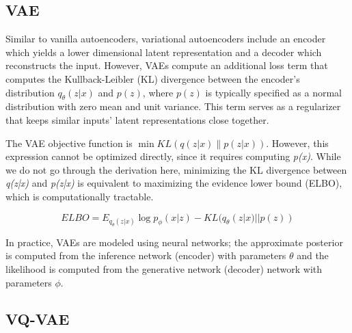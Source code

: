 \documentclass{article}
\begin{document}
\subsection{VAE}

Similar to vanilla autoencoders, variational autoencoders include an encoder which yields a lower dimensional latent representation and a decoder which reconstructs the input. However, VAEs compute an additional loss term that computes the Kullback-Leibler (KL) divergence between the encoder’s distribution \(q_{\theta}(z|x)\) and \(p(z)\), where \(p(z)\) is typically specified as a normal distribution with zero mean and unit variance. This term serves as a regularizer that keeps similar inputs’ latent representations close together.


The VAE objective function is $\min{KL(q(z|x) \| p(z|x))}$. However, this expression cannot be optimized directly, since it requires computing \textit{p(x)}. While we do not go through the derivation here, minimizing the KL divergence between \textit{q(z|x)} and \textit{p(z|x)} is equivalent to maximizing the evidence lower bound (ELBO), which is computationally tractable. 

\begin{equation}
ELBO = E_{q_{\theta}(z|x)} \log{p_{\phi}(x|z)} - KL(q_{\theta}(z|x)||p(z))
\end{equation}

In practice, VAEs are modeled using neural networks; the approximate posterior is computed from the inference network (encoder) with parameters \(\theta\) and the likelihood is computed from the generative network (decoder) network with parameters \(\phi\). 

\subsection{VQ-VAE}
\end{document}
